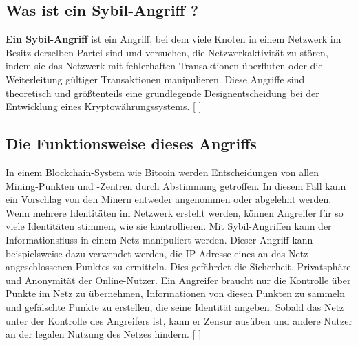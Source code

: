 \documentclass[ngerman]{scrreprt}
\begin{document}
\subsection{Was ist ein Sybil-Angriff ?}
\textbf{Ein Sybil-Angriff} ist ein Angriff, bei dem viele Knoten in einem Netzwerk im Besitz derselben Partei sind und versuchen, die Netzwerkaktivität zu stören, indem sie das Netzwerk mit fehlerhaften Transaktionen überfluten oder die Weiterleitung gültiger Transaktionen manipulieren. 
Diese Angriffe sind theoretisch und größtenteils eine grundlegende Designentscheidung bei der Entwicklung eines Kryptowährungssystems. [ \cite{allatacks} ]
\subsection{Die Funktionsweise dieses Angriffs}
In einem Blockchain-System wie Bitcoin werden Entscheidungen von allen Mining-Punkten und -Zentren durch Abstimmung getroffen. In diesem Fall kann ein Vorschlag von den Minern entweder angenommen oder abgelehnt werden. Wenn mehrere Identitäten im Netzwerk erstellt werden, können Angreifer für so viele Identitäten stimmen, wie sie kontrollieren.
Mit Sybil-Angriffen kann der Informationsfluss in einem Netz manipuliert werden. Dieser Angriff kann beispielsweise dazu verwendet werden, die IP-Adresse eines an das Netz angeschlossenen Punktes zu ermitteln. Dies gefährdet die Sicherheit, Privatsphäre und Anonymität der Online-Nutzer. Ein Angreifer braucht nur die Kontrolle über Punkte im Netz zu übernehmen, Informationen von diesen Punkten zu sammeln und gefälschte Punkte zu erstellen, die seine Identität angeben.
Sobald das Netz unter der Kontrolle des Angreifers ist, kann er Zensur ausüben und andere Nutzer an der legalen Nutzung des Netzes hindern. [ \cite{sybil_attack} ]
\end{document}
